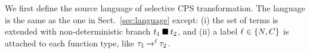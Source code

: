 
%

We first define the source language of selective CPS transformation.
The language is the same as the one in Sect.~\ref{sec:language} except: (i) the set
of terms is extended with non-deterministic branch ${t_1}\mathbin{\blacksquare}{t_2}$, and (ii)
a label $\ell \in \{N,C\}$ is attached to each function type, like
${\tau_1}\mathbin{\rightarrow^{\ell}}{\tau_2}$.

